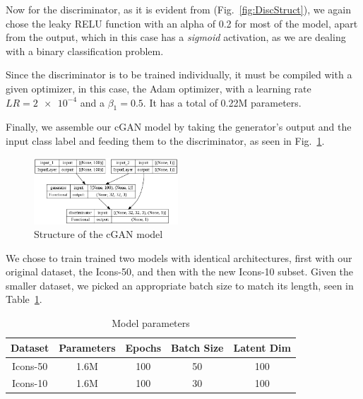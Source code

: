Now for the discriminator, as it is evident from (Fig.~\ref{fig:DiscStruct}), we again chose the leaky RELU function with an alpha of 0.2 for most of the model, apart from the output, which in this case has a \textit{sigmoid} activation, as we are dealing with a binary classification problem.

Since the discriminator is to be trained individually, it must be compiled with a given optimizer, in this case, the Adam optimizer, with a learning rate $LR=\num{2e-4}$ and a $\beta_1=0.5$.
It has a total of 0.22M parameters.

Finally, we assemble our cGAN model by taking the generator's output and the input class label and feeding them to the discriminator, as seen in Fig.~\ref{fig:cGANStruct}.

\begin{figure}[htbp]
    \centering
    \includegraphics[width=0.48\textwidth]{images/summary/cgan}
    \caption{Structure of the cGAN model}
    \label{fig:cGANStruct}
\end{figure}

We chose to train trained two models with identical architectures, first with our original dataset, the Icons-50, and then with the new Icons-10 subset.
Given the smaller dataset, we picked an appropriate batch size to match its length, seen in Table~\ref{tab:ModelParams}.

\begin{table}[htbp]
    \centering
    \caption{Model parameters}
    \begin{tabular}{ccccc}
        \hline
        \textbf{Dataset} & \textbf{Parameters} & \textbf{Epochs} & \textbf{Batch Size} & \textbf{Latent Dim} \\ \hline
        Icons-50         & 1.6M                & 100             & 50                  & 100                 \\
        Icons-10         & 1.6M                & 100             & 30                  & 100                 \\ \hline
    \end{tabular}
    \label{tab:ModelParams}
\end{table}